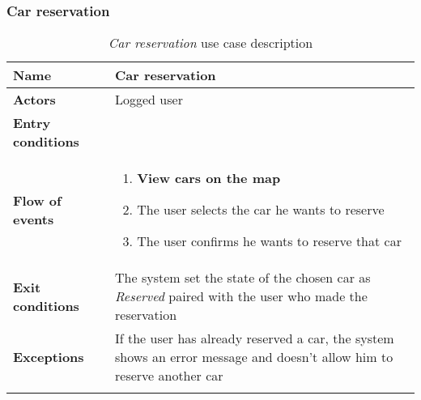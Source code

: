 \clearpage
\subsubsection{Car reservation}
\begin{longtable}{p{0.25\linewidth}p{0.75\linewidth}}
\toprule
\textbf{Name} & \textbf{Car reservation} \\
\midrule
\textbf{Actors} &  Logged user \\
\midrule
\textbf{Entry conditions} & \\
\midrule
\textbf{Flow of events} & 
\begin{enumerate}
	\item \textbf{View cars on the map}
	\item The user selects the car he wants to reserve
	\item The user confirms he wants to reserve that car
\end{enumerate}\\
\midrule
\textbf{Exit conditions} & The system set the state of the chosen car as \emph{Reserved} paired with the user who made the reservation\\
\midrule
\textbf{Exceptions} &  If the user has already reserved a car, the system shows an error message and doesn't allow him to reserve another car \\
\bottomrule
\caption{\emph{Car reservation} use case description}
\end{longtable}

\clearpage
